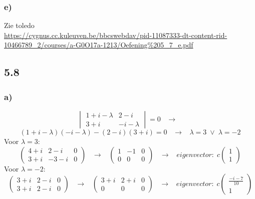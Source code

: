 \documentclass[11pt]{article}
\begin{document}
\subsubsection*{e)}
Zie toledo\\
\url{https://cygnus.cc.kuleuven.be/bbcswebdav/pid-11087333-dt-content-rid-10466789_2/courses/a-G0O17a-1213/Oefening%205_7_e.pdf}

\subsection*{5.8}
\subsubsection*{a)}
\[
\begin{vmatrix}
1+i-\lambda & 2-i \\
3+i & -i-\lambda
\end{vmatrix}
=0
\;\;\;\longrightarrow\;\;\;
\]
\[
(1+i-\lambda)(-i-\lambda)-(2-i)(3+i)=0
\;\;\;\longrightarrow\;\;\;
\lambda = 3 \;\vee\; \lambda = -2
\]
Voor $\lambda = 3$: 
\[
\left(
\begin{array}{cc|c}
4+i & 2-i & 0 \\
3+i & -3-i & 0
\end{array}
\right)
\;\;\;\longrightarrow\;\;\;
\left(
\begin{array}{cc|c}
1 & -1 & 0 \\
0 & 0 & 0
\end{array}
\right)
\;\;\;\longrightarrow\;\;\;
eigenvector:\;
c
\begin{pmatrix}
1\\1
\end{pmatrix}
\]
Voor $\lambda = -2$: 
\[
\left(
\begin{array}{cc|c}
3+i & 2-i & 0 \\
3+i & 2-i & 0
\end{array}
\right)
\;\;\;\longrightarrow\;\;\;
\left(
\begin{array}{cc|c}
3+i & 2+i & 0 \\
0 & 0 & 0
\end{array}
\right)
\;\;\;\longrightarrow\;\;\;
eigenvector:\;
c
\begin{pmatrix}
\frac{-i-7}{10}\\1
\end{pmatrix}
\]
\end{document}
